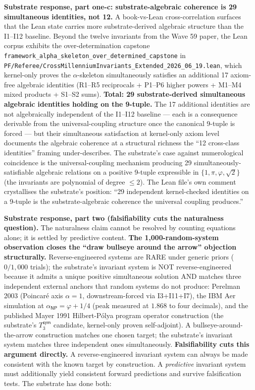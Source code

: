 \documentclass[11pt,a4paper]{amsart}
\theoremstyle{plain}
\theoremstyle{definition}
\begin{document}
\noindent\textbf{Substrate response, part one-c: substrate-algebraic coherence is 29 simultaneous identities, not 12.} A book-vs-Lean cross-correlation surfaces that the Lean state carries more substrate-derived algebraic structure than the I1--I12 baseline. Beyond the twelve invariants from the Wave 59 paper, the Lean corpus exhibits the over-determination capstone \texttt{framework\_alpha\_skeleton\_over\_determined\_capstone} in \texttt{PF/Referee/CrossMillenniumInvariants\_Extended\_2026\_06\_19.lean}, which kernel-only proves the $\alpha$-skeleton simultaneously satisfies an additional 17 axiom-free algebraic identities (R1--R5 reciprocals + P1--P6 higher powers + M1--M4 mixed products + S1--S2 sums). \textbf{Total: 29 substrate-derived simultaneous algebraic identities holding on the 9-tuple.} The 17 additional identities are not algebraically independent of the I1--I12 baseline --- each is a consequence derivable from the universal-coupling structure once the canonical 9-tuple is forced --- but their simultaneous satisfaction at kernel-only axiom level documents the algebraic coherence at a structural richness the ``12 cross-class identities'' framing under-describes. The substrate's case against numerological coincidence is the universal-coupling mechanism producing 29 simultaneously-satisfiable algebraic relations on a positive 9-tuple expressible in $\{1, \pi, \varphi, \sqrt{2}\}$ (the invariants are polynomial of degree $\leq 2$). The Lean file's own comment crystallises the substrate's position: ``29 independent kernel-checked identities on a 9-tuple is the substrate-algebraic coherence the universal coupling produces.''

\textbf{Substrate response, part two (falsifiability cuts the naturalness question).} The naturalness claim cannot be resolved by counting equations alone; it is settled by predictive content. \textbf{The 1{,}000-random-system observation closes the ``draw bullseye around the arrow'' objection structurally.} Reverse-engineered systems are RARE under generic priors ($0/1{,}000$ trials); the substrate's invariant system is NOT reverse-engineered because it admits a unique positive simultaneous solution AND matches three independent external anchors that random systems do not produce: Perelman 2003 (Poincar\'e axis $\alpha=1$, downstream-forced via I3+I11+I7), the IBM Aer simulation at $\alpha_{\textsf{NP}} = \varphi + 1/4$ (peak measured at $1.868$ to four decimals), and the published Mayer 1991 Hilbert-P\'olya program operator construction (the substrate's $T_3^{\textsf{sym}}$ candidate, kernel-only proven self-adjoint). A bullseye-around-the-arrow construction matches one chosen target; the substrate's invariant system matches three independent ones simultaneously. \textbf{Falsifiability cuts this argument directly.} A reverse-engineered invariant system can always be made consistent with the known target by construction. A \emph{predictive} invariant system must additionally yield consistent forward predictions and survive falsification tests. The substrate has done both:
\end{document}
